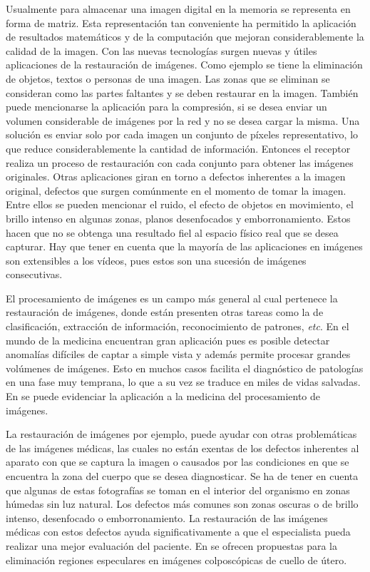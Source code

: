 Usualmente para almacenar una imagen digital en la memoria se representa en forma de matriz. Esta representaci\'on tan conveniente ha permitido la aplicaci\'on de resultados matem\'aticos y de la computaci\'on que mejoran considerablemente la calidad de la imagen. Con las nuevas tecnolog\'ias surgen nuevas y \'utiles aplicaciones de la restauraci\'on de im\'agenes. Como ejemplo se tiene la eliminaci\'on de objetos, textos o personas de una imagen. Las zonas que se eliminan se consideran como las partes faltantes y se deben restaurar en la imagen. También puede mencionarse la aplicaci\'on para la compresi\'on, si se desea enviar un volumen considerable de imágenes por la red y no se desea cargar la misma. Una solución es enviar solo por cada imagen un conjunto de p\'ixeles representativo, lo que reduce considerablemente la cantidad de informaci\'on. Entonces el receptor realiza un proceso de restauraci\'on con cada conjunto para obtener las imágenes originales. Otras aplicaciones giran en torno a defectos inherentes a la imagen original, defectos que surgen comúnmente en el momento de tomar la imagen. Entre ellos se pueden mencionar el ruido, el efecto de objetos en movimiento, el brillo intenso en algunas zonas, planos desenfocados y emborronamiento. Estos hacen que no se obtenga una resultado fiel al espacio físico real que se desea capturar. Hay que tener en cuenta que la mayor\'ia de las aplicaciones en im\'agenes son extensibles a los vídeos, pues estos son una sucesión de imágenes consecutivas.

El procesamiento de im\'agenes es un campo m\'as general al cual pertenece la restauraci\'on de im\'agenes, donde est\'an presenten otras tareas como la de clasificaci\'on, extracci\'on de informaci\'on, reconocimiento de patrones, \textit{etc}. En el mundo de la medicina encuentran gran aplicaci\'on pues es posible detectar anomalías difíciles de captar a simple vista y adem\'as permite procesar grandes volúmenes de imágenes. Esto en muchos casos facilita el diagn\'ostico de patologías en una fase muy temprana, lo que a su vez se traduce en miles de vidas salvadas. En \cite{afals2016tesis} se puede evidenciar la aplicaci\'on a la medicina del procesamiento de im\'agenes.

La restauraci\'on de im\'agenes por ejemplo, puede ayudar con otras problemáticas de las im\'agenes m\'edicas, las cuales no est\'an exentas de los defectos inherentes al aparato con que se captura la imagen o causados por las condiciones en que se encuentra la zona del cuerpo que se desea diagnosticar. Se ha de tener en cuenta que algunas de estas fotograf\'ias se toman en el interior del organismo en zonas h\'umedas sin luz natural. Los defectos m\'as comunes son zonas oscuras o de brillo intenso, desenfocado o emborronamiento. La restauración de las imágenes médicas con estos defectos ayuda significativamente a que el especialista pueda realizar una mejor evaluación del paciente. En \cite{dgomez2018tesis,apalmer2015tesis} se ofrecen propuestas para la eliminaci\'on regiones especulares en imágenes colposcópicas de cuello de útero.

